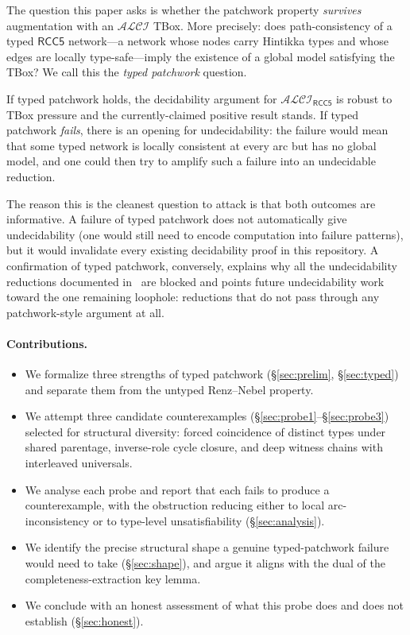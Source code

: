 \documentclass[11pt]{article}
\theoremstyle{definition}
\theoremstyle{remark}
\newcommand{\ALCIRCC}[1]{\mathcal{ALCI}_{\mathsf{RCC#1}}}
\begin{document}
The question this paper asks is whether the patchwork property
\emph{survives} augmentation with an $\mathcal{ALCI}$ TBox.  More
precisely: does path-consistency of a typed $\mathsf{RCC5}$ network---a
network whose nodes carry Hintikka types and whose edges are locally
type-safe---imply the existence of a global model satisfying the
TBox?  We call this the \emph{typed patchwork} question.

If typed patchwork holds, the decidability argument for
$\ALCIRCC{5}$ is robust to TBox pressure and the currently-claimed
positive result stands.  If typed patchwork \emph{fails}, there is an
opening for undecidability: the failure would mean that some typed
network is locally consistent at every arc but has no global model,
and one could then try to amplify such a failure into an undecidable
reduction.

The reason this is the cleanest question to attack is that both
outcomes are informative.  A failure of typed patchwork does not
automatically give undecidability (one would still need to encode
computation into failure patterns), but it would invalidate every
existing decidability proof in this repository.  A confirmation of
typed patchwork, conversely, explains why all the undecidability
reductions documented in~\cite{README} are blocked and points future
undecidability work toward the one remaining loophole: reductions
that do not pass through any patchwork-style argument at all.

\paragraph{Contributions.}
\begin{itemize}
  \item We formalize three strengths of typed patchwork
    (\S\ref{sec:prelim}, \S\ref{sec:typed}) and separate them from
    the untyped Renz--Nebel property.
  \item We attempt three candidate counterexamples
    (\S\ref{sec:probe1}--\S\ref{sec:probe3}) selected for structural
    diversity: forced coincidence of distinct types under shared
    parentage, inverse-role cycle closure, and deep witness chains
    with interleaved universals.
  \item We analyse each probe and report that each fails to produce a
    counterexample, with the obstruction reducing either to local
    arc-inconsistency or to type-level unsatisfiability
    (\S\ref{sec:analysis}).
  \item We identify the precise structural shape a genuine typed-patchwork
    failure would need to take (\S\ref{sec:shape}), and argue it
    aligns with the dual of the completeness-extraction key lemma.
  \item We conclude with an honest assessment of what this probe does
    and does not establish (\S\ref{sec:honest}).
\end{itemize}
\end{document}
